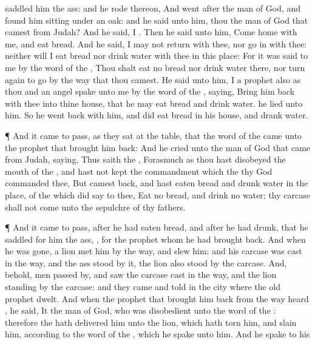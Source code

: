 {saddled him the
ass: and he
rode thereon,
And
went
after the
man of
God, and
found him
sitting under an
oak: and he
said unto him,
{} thou the
man of
God that
camest from
Judah? And he
said, I
{}.
Then he
said unto him,
Come
home with me, and
eat
bread.
And he
said, I
may not
return with thee, nor go
in with thee: neither will I
eat
bread nor
drink
water with thee in this
place:
For it was
said to me by the
word of the
{}, Thou shalt
eat no
bread nor
drink
water there, nor turn
again to
go by the
way that thou
camest.
He
said unto him, I
{} a
prophet also as thou
{} and an
angel
spake unto me by the
word of the
{},
saying, Bring him
back with thee into thine
house, that he may
eat
bread and
drink
water.
{} he
lied unto him.
So he went
back with him, and did
eat
bread in his
house, and
drank
water.
\par }{\PP {}¶ And it came to pass, as they
sat at the
table, that the
word of the
{} came unto the
prophet that brought him
back:
And he
cried unto the
man of
God that
came from
Judah,
saying, Thus
saith the
{}, Forasmuch
as thou hast
disobeyed the
mouth of the
{}, and hast not
kept the
commandment which the
{} thy
God
commanded thee,
But camest
back, and hast
eaten
bread and
drunk
water in the
place, of the which
{} did
say to thee,
Eat no
bread, and
drink no
water; thy
carcase shall not
come unto the
sepulchre of thy
fathers.
\par }{\PP {}¶ And it came to pass,
after he had
eaten
bread, and
after he had
drunk, that he
saddled for him the
ass,
{}, for the
prophet whom he had brought
back.
And when he was
gone, a
lion
met him by the
way, and
slew him: and his
carcase was
cast in the
way, and the
ass
stood
by it, the
lion also
stood by the
carcase.
And, behold,
men passed
by, and
saw the
carcase
cast in the
way, and the
lion
standing
by the
carcase: and they
came and
told
{} in the
city where the
old
prophet
dwelt.
And when the
prophet that brought him
back from the
way
heard
{}, he
said, It
{} the
man of
God, who was
disobedient unto the
word of the
{}: therefore the
{} hath
delivered him unto the
lion, which hath
torn him, and
slain him, according to the
word of the
{}, which he
spake unto him.
And he
spake to his
}
